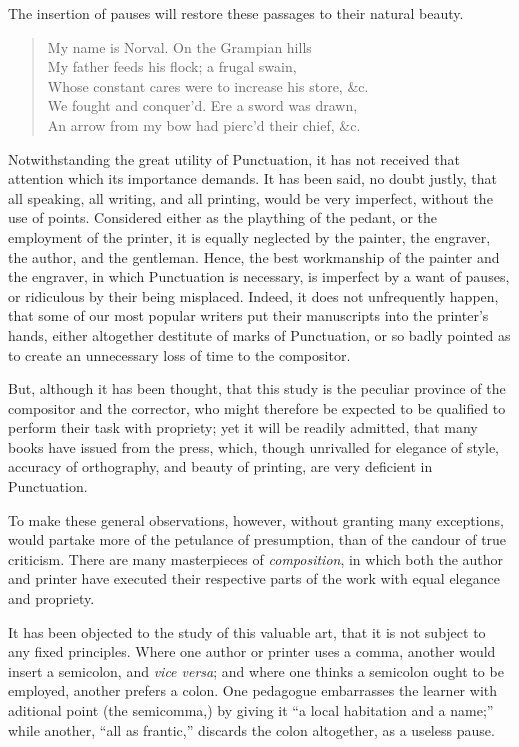 The insertion of pauses will restore these passages to their natural beauty.

\begin{quote}
My name is Norval. On the Grampian hills\\
My father feeds his flock; a frugal swain,\\
Whose constant cares were to increase his store, \&c.\\
We fought and conquer'd. Ere a sword was drawn,\\
An arrow from my bow had pierc'd their chief, \&c.
\end{quote}

Notwithstanding the great utility of Punctuation, it has not received that
attention which its importance demands. It has been said, no doubt justly, that
all speaking, all writing, and all printing, would be very imperfect, without
the use of points. Considered either as the plaything of the pedant, or the
employment of the printer, it is equally neglected by the painter, the engraver,
the author, and the gentleman. Hence, the best workmanship of the painter and
the engraver, in which Punctuation is necessary, is imperfect by a want of
pauses, or ridiculous by their being misplaced. Indeed, it does not unfrequently
happen, that some of our most popular writers put their manuscripts into the
printer's hands, either altogether destitute of marks of Punctuation, or so
badly pointed as to create an unnecessary loss of time to the compositor.

But, although it has been thought, that this study is the peculiar province of
the compositor and the corrector, who might therefore be expected to be
qualified to perform their task with propriety; yet it will be readily admitted,
that many books have issued from the press, which, though unrivalled for
elegance of style, accuracy of orthography, and beauty of printing, are very
deficient in Punctuation.

To make these general observations, however, without granting many exceptions,
would partake more of the petulance of presumption, than of the candour of true
criticism. There are many masterpieces of \emph{composition}, in which both the
author and printer have executed their respective parts of the work with equal
elegance and propriety.

It has been objected to the study of this valuable art, that it is not subject
to any fixed principles. Where one author or printer uses a comma, another would
insert a semicolon, and \emph{vice versa}; and where one thinks a semicolon
ought to be employed, another prefers a colon. One pedagogue embarrasses the
learner with aditional point (the semicomma,) by giving it ``a local habitation
and a name;'' while another, ``all as frantic,'' discards the colon altogether,
as a useless pause.

